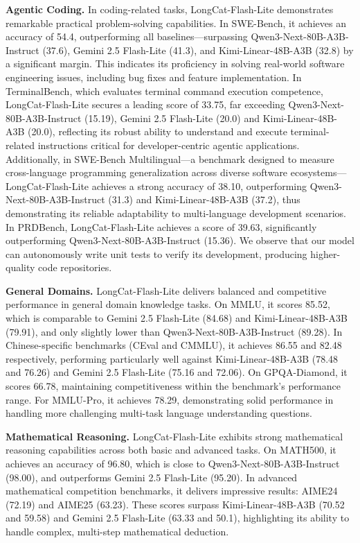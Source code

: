 \documentclass{article}
\newcommand{\longcat}{LongCat-Flash-Lite\xspace}
\begin{document}
\textbf{Agentic Coding.} In coding-related tasks, \longcat demonstrates remarkable practical problem-solving capabilities. In SWE-Bench, it achieves an accuracy of 54.4, outperforming all baselines—surpassing Qwen3-Next-80B-A3B-Instruct (37.6), Gemini 2.5 Flash-Lite (41.3), and Kimi-Linear-48B-A3B (32.8) by a significant margin. This indicates its proficiency in solving real-world software engineering issues, including bug fixes and feature implementation. In TerminalBench, which evaluates terminal command execution competence, \longcat secures a leading score of 33.75, far exceeding Qwen3-Next-80B-A3B-Instruct (15.19), Gemini 2.5 Flash-Lite (20.0) and Kimi-Linear-48B-A3B (20.0), reflecting its robust ability to understand and execute terminal-related instructions critical for developer-centric agentic applications. Additionally, in SWE-Bench Multilingual—a benchmark designed to measure cross-language programming generalization across diverse software ecosystems—\longcat achieves a strong accuracy of 38.10, outperforming Qwen3-Next-80B-A3B-Instruct (31.3) and Kimi-Linear-48B-A3B (37.2), thus demonstrating its reliable adaptability to multi-language development scenarios. In PRDBench, \longcat achieves a score of 39.63, significantly outperforming Qwen3-Next-80B-A3B-Instruct (15.36). We observe that our model can autonomously write unit tests to verify its development, producing higher-quality code repositories.

\textbf{General Domains.} \longcat delivers balanced and competitive performance in general domain knowledge tasks. On MMLU, it scores 85.52, which is comparable to Gemini 2.5 Flash-Lite (84.68) and Kimi-Linear-48B-A3B (79.91), and only slightly lower than Qwen3-Next-80B-A3B-Instruct (89.28). In Chinese-specific benchmarks (CEval and CMMLU), it achieves 86.55 and 82.48 respectively, performing particularly well against Kimi-Linear-48B-A3B (78.48 and 76.26) and Gemini 2.5 Flash-Lite (75.16 and 72.06). On GPQA-Diamond, it scores 66.78, maintaining competitiveness within the benchmark’s performance range. For MMLU-Pro, it achieves 78.29, demonstrating solid performance in handling more challenging multi-task language understanding questions.

\textbf{Mathematical Reasoning.} \longcat exhibits strong mathematical reasoning capabilities across both basic and advanced tasks. On MATH500, it achieves an accuracy of 96.80, which is close to Qwen3-Next-80B-A3B-Instruct (98.00), and outperforms Gemini 2.5 Flash-Lite (95.20). In advanced mathematical competition benchmarks, it delivers impressive results: AIME24 (72.19) and AIME25 (63.23). These scores surpass Kimi-Linear-48B-A3B (70.52 and 59.58) and Gemini 2.5 Flash-Lite (63.33 and 50.1), highlighting its ability to handle complex, multi-step mathematical deduction.
\end{document}
